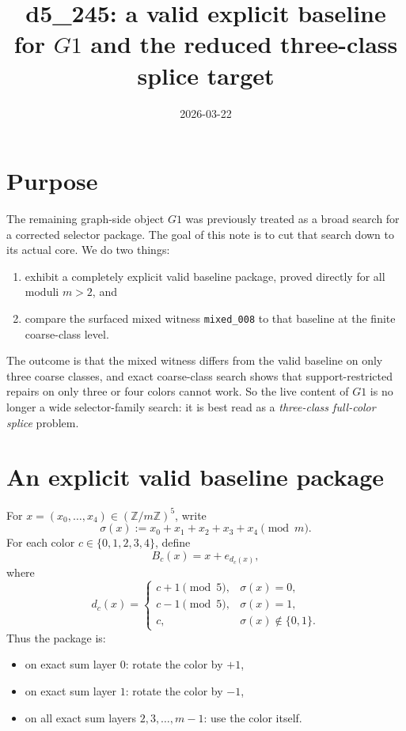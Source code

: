 \documentclass[11pt]{article}
\title{d5\_245: a valid explicit baseline for \(G1\) and the reduced three-class splice target}
\author{}
\date{2026-03-22}
\begin{document}
\maketitle

\section{Purpose}
The remaining graph-side object \(G1\) was previously treated as a broad search
for a corrected selector package.
The goal of this note is to cut that search down to its actual core.
We do two things:
\begin{enumerate}[label=\textup{(\arabic*)},leftmargin=2.8em]
\item exhibit a completely explicit valid baseline package, proved directly for
all moduli \(m>2\), and
\item compare the surfaced mixed witness \texttt{mixed\_008} to that baseline at
the finite coarse-class level.
\end{enumerate}
The outcome is that the mixed witness differs from the valid baseline on only
three coarse classes, and exact coarse-class search shows that support-restricted
repairs on only three or four colors cannot work.
So the live content of \(G1\) is no longer a wide selector-family search: it is
best read as a \emph{three-class full-color splice} problem.

\section{An explicit valid baseline package}
For \(x=(x_0,\dots,x_4)\in (\mathbb Z/m\mathbb Z)^5\), write
\[
\sigma(x):=x_0+x_1+x_2+x_3+x_4 \pmod m.
\]
For each color \(c\in\{0,1,2,3,4\}\), define
\[
B_c(x)=x+e_{d_c(x)},
\]
where
\[
d_c(x)=
\begin{cases}
 c+1 \pmod 5, & \sigma(x)=0,\\
 c-1 \pmod 5, & \sigma(x)=1,\\
 c, & \sigma(x)\notin\{0,1\}.
\end{cases}
\]
Thus the package is:
\begin{itemize}[leftmargin=2.4em]
\item on exact sum layer \(0\): rotate the color by \(+1\),
\item on exact sum layer \(1\): rotate the color by \(-1\),
\item on all exact sum layers \(2,3,\dots,m-1\): use the color itself.
\end{itemize}
\end{document}
